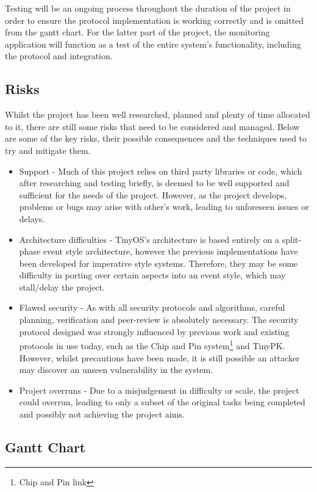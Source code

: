 \documentclass{mprop}
\begin{document}
Testing will be an ongoing process throughout the duration of the project in order to ensure the protocol implementation is working correctly and is omitted from the gantt chart. For the latter part of the project, the monitoring application will function as a test of the entire system's functionality, including the protocol and integration.



\subsection{Risks} %
\label{sub:risks}
Whilst the project has been well researched, planned and plenty of time allocated to it, there are still some risks that need to be considered and managed. Below are some of the key risks, their possible consequences and the techniques used to try and mitigate them.
\begin{itemize}
  \item Support - Much of this project relies on third party libraries or code, which after researching and testing briefly, is deemed to be well supported and sufficient for the needs of the project. However, as the project develops, problems or bugs may arise with other's work, leading to unforeseen issues or delays.
  \item Architecture difficulties - TinyOS's architecture is based entirely on a split-phase event style architecture, however the previous implementations have been developed for imperative style systems. Therefore, they may be some difficulty in porting over certain aspects into an event style, which may stall/delay the project.
  \item Flawed security - As with all security protocols and algorithms, careful planning, verification and peer-review is absolutely necessary. The security protocol designed was strongly influenced by previous work and existing protocols in use today, such as the Chip and Pin system\footnote{Chip and Pin link} and TinyPK. However, whilst precautions have been made, it is still possible an attacker may discover an unseen vulnerability in the system. 
  \item Project overruns - Due to a misjudgement in difficulty or scale, the project could overrun, leading to only a subset of the original tasks being completed and possibly not achieving the project aims.
\end{itemize}

\subsection{Gantt Chart} %
\label{sub:gantt_chart}


\newpage


\end{document}
